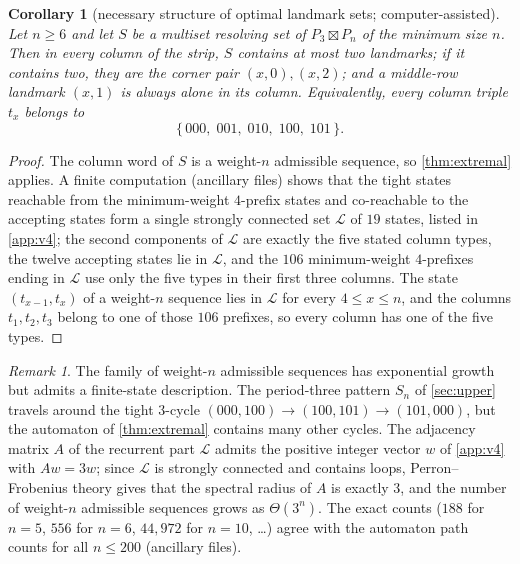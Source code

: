\documentclass[11pt]{amsart}
\newtheorem{corollary}[corollary]{Corollary}
\theoremstyle{remark}
\newtheorem{remark}[remark]{Remark}
\begin{document}
\begin{corollary}[necessary structure of optimal landmark sets; computer-assisted]\label{cor:structure}
Let $n\ge 6$ and let $S$ be a multiset resolving set of $P_3\boxtimes P_n$ of the minimum size $n$.  Then in every column of the strip, $S$ contains at most two landmarks; if it contains two, they are the corner pair $(x,0),(x,2)$; and a middle-row landmark $(x,1)$ is always alone in its column.  Equivalently, every column triple $t_x$ belongs to
\[
 \{\,000,\;001,\;010,\;100,\;101\,\} .
\]
\end{corollary}

\begin{proof}
The column word of $S$ is a weight-$n$ admissible sequence, so \cref{thm:extremal} applies.  A finite computation (ancillary files) shows that the tight states reachable from the minimum-weight $4$-prefix states and co-reachable to the accepting states form a single strongly connected set $\mathcal L$ of $19$ states, listed in \cref{app:v4}; the second components of $\mathcal L$ are exactly the five stated column types, the twelve accepting states lie in $\mathcal L$, and the $106$ minimum-weight $4$-prefixes ending in $\mathcal L$ use only the five types in their first three columns.  The state $(t_{x-1},t_x)$ of a weight-$n$ sequence lies in $\mathcal L$ for every $4\le x\le n$, and the columns $t_1,t_2,t_3$ belong to one of those $106$ prefixes, so every column has one of the five types.
\end{proof}

\begin{remark}\label{rem:automaton}
The family of weight-$n$ admissible sequences has exponential growth but admits a finite-state description.  The period-three pattern $S_n$ of \cref{sec:upper} travels around the tight $3$-cycle $(000,100)\to(100,101)\to(101,000)$, but the automaton of \cref{thm:extremal} contains many other cycles.  The adjacency matrix $A$ of the recurrent part $\mathcal L$ admits the positive integer vector $w$ of \cref{app:v4} with $Aw=3w$; since $\mathcal L$ is strongly connected and contains loops, Perron--Frobenius theory gives that the spectral radius of $A$ is exactly $3$, and the number of weight-$n$ admissible sequences grows as $\Theta(3^n)$.  The exact counts ($188$ for $n=5$, $556$ for $n=6$, $44{,}972$ for $n=10$, \dots) agree with the automaton path counts for all $n\le 200$ (ancillary files).
\end{remark}
\end{document}
